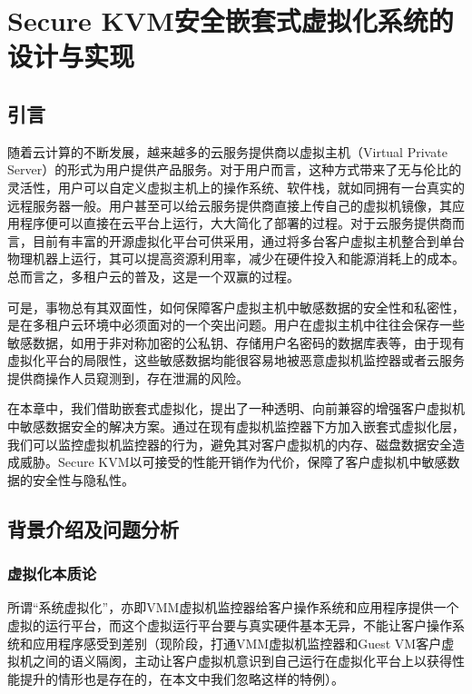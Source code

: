 
\chapter{Secure KVM安全嵌套式虚拟化系统的设计与实现}
\label{chap:securekvm}



\section{引言}

随着云计算的不断发展，越来越多的云服务提供商以虚拟主机（Virtual Private Server）的形式为用户提供产品服务。对于用户而言，这种方式带来了无与伦比的灵活性，用户可以自定义虚拟主机上的操作系统、软件栈，就如同拥有一台真实的远程服务器一般。用户甚至可以给云服务提供商直接上传自己的虚拟机镜像，其应用程序便可以直接在云平台上运行，大大简化了部署的过程。对于云服务提供商而言，目前有丰富的开源虚拟化平台可供采用，通过将多台客户虚拟主机整合到单台物理机器上运行，其可以提高资源利用率，减少在硬件投入和能源消耗上的成本。总而言之，多租户云的普及，这是一个双赢的过程。

可是，事物总有其双面性，如何保障客户虚拟主机中敏感数据的安全性和私密性，是在多租户云环境中必须面对的一个突出问题。用户在虚拟主机中往往会保存一些敏感数据，如用于非对称加密的公私钥、存储用户名密码的数据库表等，由于现有虚拟化平台的局限性，这些敏感数据均能很容易地被恶意虚拟机监控器或者云服务提供商操作人员窥测到，存在泄漏的风险。

在本章中，我们借助嵌套式虚拟化，提出了一种透明、向前兼容的增强客户虚拟机中敏感数据安全的解决方案。通过在现有虚拟机监控器下方加入嵌套式虚拟化层，我们可以监控虚拟机监控器的行为，避免其对客户虚拟机的内存、磁盘数据安全造成威胁。Secure KVM以可接受的性能开销作为代价，保障了客户虚拟机中敏感数据的安全性与隐私性。

\section{背景介绍及问题分析}

\subsection{虚拟化本质论}

所谓“系统虚拟化”，亦即VMM虚拟机监控器给客户操作系统和应用程序提供一个虚拟的运行平台，而这个虚拟运行平台要与真实硬件基本无异，不能让客户操作系统和应用程序感受到差别（现阶段，打通VMM虚拟机监控器和Guest VM客户虚拟机之间的语义隔阂，主动让客户虚拟机意识到自己运行在虚拟化平台上以获得性能提升的情形也是存在的，在本文中我们忽略这样的特例）。

